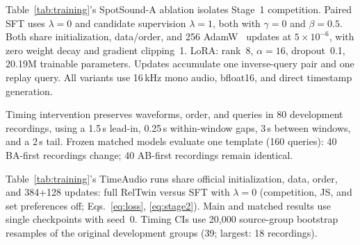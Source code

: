 Table~\ref{tab:training}'s SpotSound-A ablation isolates Stage~1 competition. Paired SFT uses $\lambda=0$ and candidate supervision $\lambda=1$, both with $\gamma=0$ and $\beta=0.5$. Both share initialization, data/order, and 256 AdamW~\cite{loshchilov2019adamw} updates at $5\times10^{-6}$, with zero weight decay and gradient clipping~1. LoRA: rank~8, $\alpha=16$, dropout~0.1, 20.19M trainable parameters. Updates accumulate one inverse-query pair and one replay query. All variants use 16\,kHz mono audio, bfloat16, and direct timestamp generation.

Timing intervention preserves waveforms, order, and queries in 80 development recordings, using a 1.5\,s lead-in, 0.25\,s within-window gaps, 3\,s between windows, and a 2\,s tail. Frozen matched models evaluate one template (160 queries): 40 BA-first recordings change; 40 AB-first recordings remain identical.

Table~\ref{tab:training}'s TimeAudio runs share official initialization, data, order, and 384+128 updates: full RelTwin versus SFT with $\lambda=0$ (competition, JS, and set preferences off; Eqs.~\ref{eq:loss}, \ref{eq:stage2}). Main and matched results use single checkpoints with seed~0. Timing CIs use 20,000 source-group bootstrap resamples of the original development groups (39; largest: 18 recordings).
